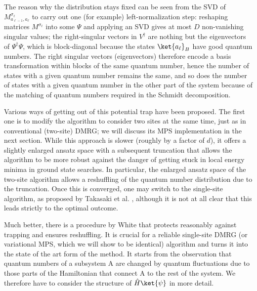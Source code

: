 The reason why the distribution stays fixed can be seen from the SVD of $M^{\sigma_{\ell}}_{a_{\ell-1},a_{\ell}}$ to carry out one (for example) left-normalization step: reshaping matrices $M^{\sigma_{\ell}}$ into some $\Psi$ and applying an SVD gives at most $D$ non-vanishing singular values; the right-singular vectors in $V^\dagger$ are nothing but the eigenvectors of  $\Psi^\dagger \Psi$, which is block-diagonal because the states $\ket{a_{\ell}}_B$ have good quantum numbers. The right singular vectors (eigenvectors) therefore encode a basis transformation within blocks of the same quantum number, hence the number of states with a given quantum number remains the same, and so does the number of states with a given quantum number in the other part of the system because of the matching of quantum numbers required in the Schmidt decomposition. 

Various ways of getting out of this potential trap have been proposed. The first one is to modify the algorithm to consider two sites at the same time, just as in conventional (two-site) DMRG; we will discuss its MPS implementation in the next section. While this approach is slower (roughly by a factor of $d$), it offers a slightly enlarged ansatz space with a subsequent truncation that allows the algorithm to be more robust against the danger of getting stuck in local energy minima in ground state searches.  In particular, the enlarged ansatz space of the two-site algorithm allows a reshuffling of the quantum number distribution due to the truncation. Once this is converged, one may switch to the single-site algorithm, as proposed by Takasaki et al. \cite{Takasaki99}, although it is not at all clear that this leads strictly to the optimal outcome\cite{McCulloch08}.

Much better, there is a procedure by White \cite{White05} that protects reasonably against trapping and ensures reshuffling. It is crucial for a reliable single-site DMRG (or variational MPS, which we will show to be identical) algorithm and turns it into the state of the art form of the method. It starts from the observation that quantum numbers of a subsystem A are changed by quantum fluctuations due to those parts of the Hamiltonian that connect A to the rest of the system.  We therefore have to consider the structure of $\hat{H}\ket{\psi}$ in more detail. 

